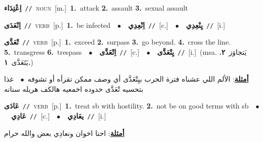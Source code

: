 \documentclass[10pt,a4paper,twoside]{article} %
\begin{document}
\begin{multicols}{2}
{\setlength\topsep{0pt}\textbf{\foreignlanguage{arabic}{اِعْتِدَاء}}\ {\color{gray}\texttt{//}\color{black}}\ \textsc{noun}\ [m.]\ \textbf{1.}~attack  \textbf{2.}~assault  \textbf{3.}~sexual assault\ } \vspace{2mm}

{\setlength\topsep{0pt}\textbf{\foreignlanguage{arabic}{اِنْعَدَى}}\ {\color{gray}\texttt{//}\color{black}}\ \textsc{verb}\ [p.]\ \textbf{1.}~be infected\ \ $\bullet$\ \ \setlength\topsep{0pt}\textbf{\foreignlanguage{arabic}{اِنْعِدِي}}\ {\color{gray}\texttt{//}\color{black}}\ [c.]\ \ $\bullet$\ \ \setlength\topsep{0pt}\textbf{\foreignlanguage{arabic}{يِنْعِدِي}}\ {\color{gray}\texttt{//}\color{black}}\ [i.]\ } \vspace{2mm}

{\setlength\topsep{0pt}\textbf{\foreignlanguage{arabic}{تْعَدَّى}}\ {\color{gray}\texttt{//}\color{black}}\ \textsc{verb}\ [p.]\ \textbf{1.}~exceed  \textbf{2.}~surpass  \textbf{3.}~go beyond.  \textbf{4.}~cross the line.  \textbf{5.}~transgress  \textbf{6.}~trespass\ \ $\bullet$\ \ \setlength\topsep{0pt}\textbf{\foreignlanguage{arabic}{اِتْعَدَّى}}\ {\color{gray}\texttt{//}\color{black}}\ [c.]\ \ $\bullet$\ \ \setlength\topsep{0pt}\textbf{\foreignlanguage{arabic}{يِتْعَدَّى}}\ {\color{gray}\texttt{//}\color{black}}\ [i.]\ \color{gray}(msa. \foreignlanguage{arabic}{يَتجاوَز}~\foreignlanguage{arabic}{\textbf{٢.}}  \foreignlanguage{arabic}{يَتَعَدَّى}~\foreignlanguage{arabic}{\textbf{١.}})\color{black}\  \begin{flushright}\color{gray}\foreignlanguage{arabic}{\textbf{\underline{\foreignlanguage{arabic}{أمثلة}}}: الألم اللي عشناه فترة الحرب بيِتْعَدَّى أي وصف ممكن تقرأه أو تشوفه\ $\bullet$\ \  غذا بتحسيه تْعَدَّى حدوده اخمعيه هالكف هريله سنانه}\end{flushright}\color{black}} \vspace{2mm}

{\setlength\topsep{0pt}\textbf{\foreignlanguage{arabic}{عَادَى}}\ {\color{gray}\texttt{//}\color{black}}\ \textsc{verb}\ [p.]\ \textbf{1.}~treat sb with hostility.  \textbf{2.}~not be on good terms with sb\ \ $\bullet$\ \ \setlength\topsep{0pt}\textbf{\foreignlanguage{arabic}{عَادِي}}\ {\color{gray}\texttt{//}\color{black}}\ [c.]\ \ $\bullet$\ \ \setlength\topsep{0pt}\textbf{\foreignlanguage{arabic}{يعَادِي}}\ {\color{gray}\texttt{//}\color{black}}\ [i.]\  \begin{flushright}\color{gray}\foreignlanguage{arabic}{\textbf{\underline{\foreignlanguage{arabic}{أمثلة}}}: احنا اخوان ونعادِي بعض والله حرام}\end{flushright}\color{black}} \vspace{2mm}


\end{multicols}
\end{document}
